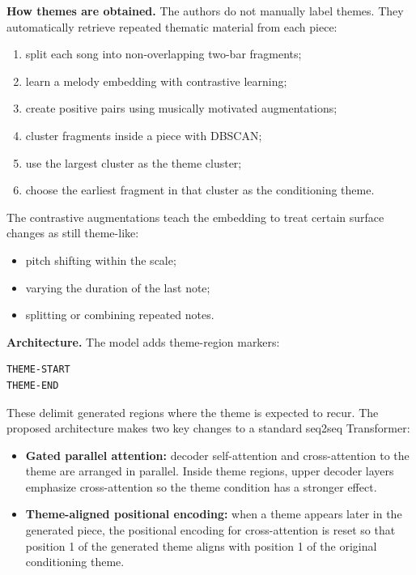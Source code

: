 \documentclass[11pt]{article}
\begin{document}
\textbf{How themes are obtained.}
The authors do not manually label themes. They automatically retrieve repeated
thematic material from each piece:

\begin{enumerate}[leftmargin=*]
  \item split each song into non-overlapping two-bar fragments;
  \item learn a melody embedding with contrastive learning;
  \item create positive pairs using musically motivated augmentations;
  \item cluster fragments inside a piece with DBSCAN;
  \item use the largest cluster as the theme cluster;
  \item choose the earliest fragment in that cluster as the conditioning theme.
\end{enumerate}

The contrastive augmentations teach the embedding to treat certain surface
changes as still theme-like:

\begin{itemize}[leftmargin=*]
  \item pitch shifting within the scale;
  \item varying the duration of the last note;
  \item splitting or combining repeated notes.
\end{itemize}

\textbf{Architecture.}
The model adds theme-region markers:

\begin{verbatim}
THEME-START
THEME-END
\end{verbatim}

These delimit generated regions where the theme is expected to recur. The
proposed architecture makes two key changes to a standard seq2seq Transformer:

\begin{itemize}[leftmargin=*]
  \item \textbf{Gated parallel attention:} decoder self-attention and
  cross-attention to the theme are arranged in parallel. Inside theme regions,
  upper decoder layers emphasize cross-attention so the theme condition has a
  stronger effect.
  \item \textbf{Theme-aligned positional encoding:} when a theme appears later in
  the generated piece, the positional encoding for cross-attention is reset so
  that position 1 of the generated theme aligns with position 1 of the original
  conditioning theme.
\end{itemize}
\end{document}

